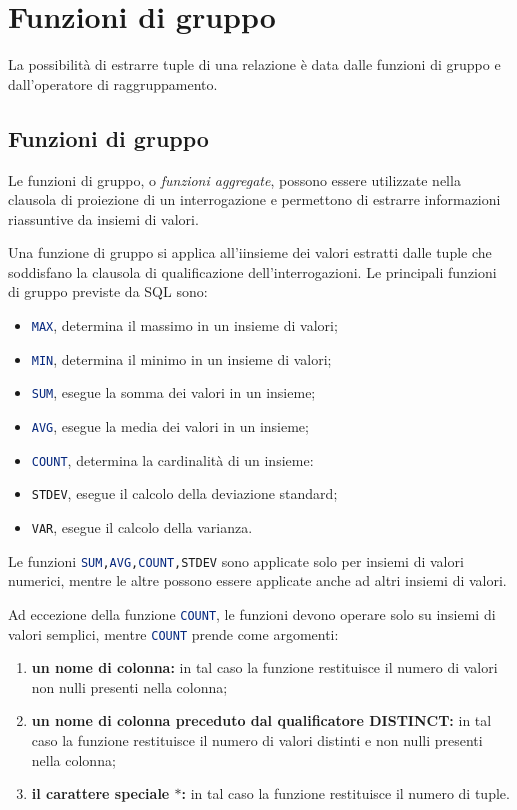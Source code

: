 \section{Funzioni di gruppo}%
\label{sec:Funzioni di gruppo}
La possibilità di estrarre tuple di una relazione è data dalle funzioni di
gruppo e dall'operatore di raggruppamento.

\subsection{Funzioni di gruppo}%
\label{sub:Funzioni di gruppo}
Le funzioni di gruppo, o \emph{funzioni aggregate}, possono essere utilizzate
nella clausola di proiezione di un interrogazione e permettono di estrarre
informazioni riassuntive da insiemi di valori.

Una funzione di gruppo si applica all'iinsieme dei valori estratti dalle tuple
che soddisfano la clausola di qualificazione dell'interrogazioni.
Le principali funzioni di gruppo previste da SQL sono:
\begin{itemize}
  \item \lstinline[language=SQL]{MAX}, determina il massimo in un insieme di
    valori;
  \item \lstinline[language=SQL]{MIN}, determina il minimo in un insieme di
    valori;
  \item \lstinline[language=SQL]{SUM}, esegue la somma dei valori in un insieme;
  \item \lstinline[language=SQL]{AVG}, esegue la media dei valori in un insieme;
  \item \lstinline[language=SQL]{COUNT}, determina la cardinalità di un insieme:
  \item \lstinline[language=SQL]{STDEV}, esegue il calcolo della deviazione
    standard;
  \item \lstinline[language=SQL]{VAR}, esegue il calcolo della varianza.
\end{itemize}

Le funzioni \lstinline[language=SQL]{SUM,AVG,COUNT,STDEV} sono
applicate solo per insiemi di valori numerici, mentre le altre possono essere
applicate anche ad altri insiemi di valori.

Ad eccezione della funzione \lstinline[language=SQL]{COUNT}, le funzioni devono
operare solo su insiemi di valori semplici, mentre
\lstinline[language=SQL]{COUNT} prende come argomenti:
\begin{enumerate}
  \item \textbf{un nome di colonna:} in tal caso la funzione restituisce il
    numero di valori non nulli presenti nella colonna;
  \item \textbf{un nome di colonna preceduto dal qualificatore DISTINCT:} in tal
    caso la funzione restituisce il numero di valori distinti e non nulli
    presenti nella colonna;
  \item \textbf{il carattere speciale $*$:} in tal caso la funzione restituisce
    il numero di tuple.
\end{enumerate}


